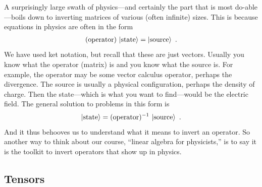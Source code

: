 \documentclass[12pt, oneside]{report}    %
\begin{document}
\begin{bigidea}\label{idea:matrix:inverse:in:physics}
A surprisingly large swath of physics---and certainly the part that is most do-able---boils down to inverting matrices of various (often infinite) sizes. This is because equations in physics are often in the form
\begin{align}
    (\textnormal{operator})\, \left|\textnormal{state}\right\rangle = \left|\textnormal{source}\right\rangle \ .
\end{align}
We have used ket notation, but recall that these are just vectors. Usually you know what the operator (matrix) is and you know what the source is. For example, the operator may be some vector calculus operator, perhaps the divergence. The source is usually a physical configuration, perhaps the density of charge. Then the state---which is what you want to find---would be the electric field. The general solution to problems in this form is
\begin{align}
 \left|\textnormal{state}\right\rangle = (\textnormal{operator})^{-1}\, \left|\textnormal{source}\right\rangle \ .
\end{align}
And it thus behooves us to understand what it means to invert an operator. So another way to think about our course, ``linear algebra for physicists,'' is to say it is the toolkit to invert operators that show up in physics.
\end{bigidea}

\subsection{Tensors}
\label{sec:index:tensors:rotation:on:each:index}
\end{document}
